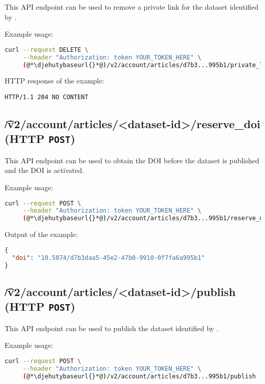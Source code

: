   This API endpoint can be used to remove a private link for the dataset identified
  by .

  Example usage:
\begin{lstlisting}[language=bash]
curl --request DELETE \
     --header "Authorization: token YOUR_TOKEN_HERE" \
     (@*\djehutybaseurl{}*@)/v2/account/articles/d7b3...995b1/private_links/8G2fk...
\end{lstlisting}

  HTTP response of the example:
\begin{lstlisting}
HTTP/1.1 204 NO CONTENT
\end{lstlisting}

\subsection{\t{/v2/account/articles/<dataset-id>/reserve\_doi} (HTTP \texttt{POST})}

  This API endpoint can be used to obtain the DOI before the dataset is
  published and the DOI is activated.

  Example usage:
\begin{lstlisting}[language=bash]
curl --request POST \
     --header "Authorization: token YOUR_TOKEN_HERE" \
     (@*\djehutybaseurl{}*@)/v2/account/articles/d7b3...995b1/reserve_doi | jq
\end{lstlisting}

  Output of the example:
\begin{lstlisting}[language=JSON]
{
  "doi": "10.5074/d7b3daa5-45e2-47b0-9910-0f7fa6a995b1"
}
\end{lstlisting}

\subsection{\t{/v2/account/articles/<dataset-id>/publish} (HTTP \texttt{POST})}

  This API endpoint can be used to publish the dataset identified by
  .


  Example usage:
\begin{lstlisting}[language=bash]
curl --request POST \
     --header "Authorization: token YOUR_TOKEN_HERE" \
     (@*\djehutybaseurl{}*@)/v2/account/articles/d7b3...995b1/publish | jq
\end{lstlisting}

